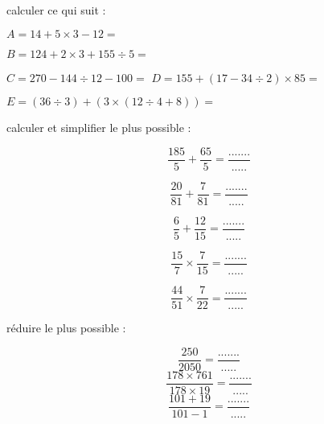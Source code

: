 \documentclass[a4paper,addpoints,12pt]{exam}
\begin{document}
\devoir[prv=false,ds=true,num=1 ,niv=1 , date=03/11/2022 ]
\begin{exo}[10]
\begin{multicols}{2}
\begin{questions}
		\question[10] calculer ce qui suit :
		
$ A=14+5\times 3-12=$

$ B=124+2\times 3+155\div 5=$

$ C=270-144\div 12-100=$
\columnbreak
$ D=155+(17-34\div 2)\times 85=$

$ E=(36\div 3)+(3\times(12\div 4+8))=$

	

	\end{questions}
	\end{multicols}
	
\end{exo}

\begin{exo}[5]
	\begin{questions}
		\question[5] calculer et simplifier le plus possible :
		\end{questions}
\begin{multicols}{2}		

\[\dfrac{185}{5}+\dfrac{65}{5}=\dfrac{.......}{.....}\]

\[\dfrac{20}{81}+\dfrac{7}{81}=\dfrac{.......}{.....}\]

\[\dfrac{6}{5}+\dfrac{12}{15}=\dfrac{.......}{.....}\]

\[\dfrac{15}{7}\times \dfrac{7}{15}=\dfrac{.......}{.....}\]

\[\dfrac{44}{51}\times\dfrac{7}{22}=\dfrac{.......}{.....}\]

\end{multicols}




	
	
	
\end{exo}

\begin{exo}[3]
\begin{questions}
		\question[3] réduire le plus possible :
		
		\[\dfrac{250}{2050}=\dfrac{.......}{.....}\]
\[\dfrac{178\times 761}{178 \times 19}=\dfrac{.......}{.....}\]
\[\dfrac{101+19}{101-1}=\dfrac{.......}{.....}\]
		
	\end{questions}
\end{exo}
\end{document}
